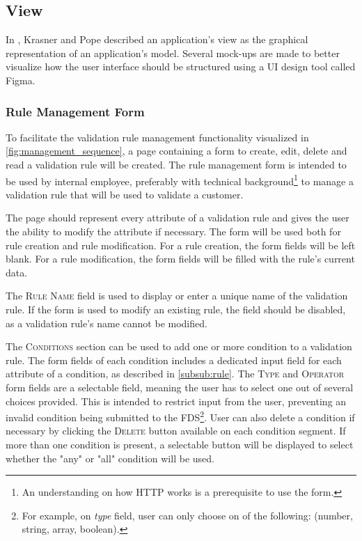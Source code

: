 \subsection{View}

In \autocite{krasner-pope-88}, Krasner and Pope described an application's view as the graphical representation of an application's model. Several mock-ups are made to better visualize how the user interface should be structured using a UI design tool called Figma.  


\subsubsection{Rule Management Form}

To facilitate the validation rule management functionality visualized in \autoref{fig:management_sequence}, a page containing a form to create, edit, delete and read a validation rule will be created. The rule management form is intended to be used by internal employee, preferably with technical background\footnote{An understanding on how HTTP works is a prerequisite to use the form.} to manage a validation rule that will be used to validate a customer.

The page should represent every attribute of a validation rule and gives the user the ability to modify the attribute if necessary. The form will be used both for rule creation and rule modification. For a rule creation, the form fields will be left blank. For a rule modification, the form fields will be filled with the rule's current data. 

The \textsc{Rule Name} field is used to display or enter a unique name of the validation rule. If the form is used to modify an existing rule, the field should be disabled, as a validation rule's name cannot be modified. 

The \textsc{Conditions} section can be used to add one or more condition to a validation rule. The form fields of each condition includes a dedicated input field for each attribute of a condition, as described in \autoref{subsub:rule}. The \textsc{Type} and \textsc{Operator} form fields are a selectable field, meaning the user has to select one out of several choices provided. This is intended to restrict input from the user, preventing an invalid condition being submitted to the FDS\footnote{For example, on \emph{type} field, user can only choose on of the following: (number, string, array, boolean).}. User can also delete a condition if necessary by clicking the \textsc{Delete} button available on each condition segment. If more than one condition is present, a selectable button will be displayed to select whether the "any" or "all" condition will be used. 

